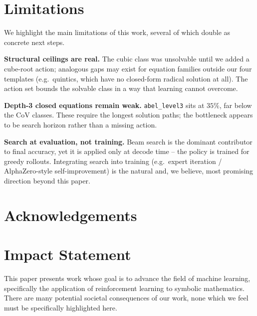 \documentclass{article}
\theoremstyle{plain}
\theoremstyle{definition}
\theoremstyle{remark}
\begin{document}

\section{Limitations}
\label{sec:limitations}
We highlight the main limitations of this work, several of which double as concrete next steps.

\textbf{Structural ceilings are real.} The cubic class was unsolvable until we added a cube-root action; analogous gaps may exist for equation families outside our four templates (e.g.\ quintics, which have no closed-form radical solution at all). The action set bounds the solvable class in a way that learning cannot overcome.

\textbf{Depth-3 closed equations remain weak.} \texttt{abel\_level3} sits at $35\%$, far below the CoV classes. These require the longest solution paths; the bottleneck appears to be search horizon rather than a missing action.

\textbf{Search at evaluation, not training.} Beam search is the dominant contributor to final accuracy, yet it is applied only at decode time -- the policy is trained for greedy rollouts. Integrating search into training (e.g.\ expert iteration / AlphaZero-style self-improvement) is the natural and, we believe, most promising direction beyond this paper.

\section*{Acknowledgements}


\section*{Impact Statement}

This paper presents work whose goal is to advance the field of machine learning, specifically the application of reinforcement learning to symbolic mathematics. There are many potential societal consequences of our work, none which we feel must be specifically highlighted here.
\end{document}
